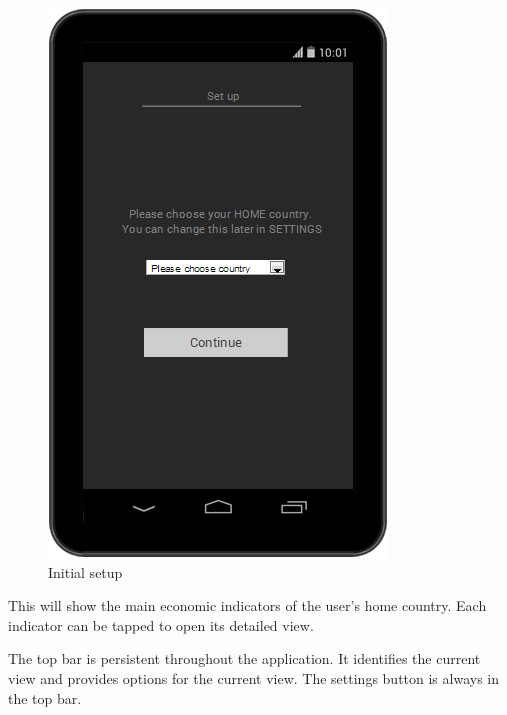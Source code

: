 \documentclass[12pt,a4paper,twoside]{article}
\begin{document}
\begin{figure}[H]
\centering
\includegraphics[scale=0.4]{mocks/setup.png}
\caption{Initial setup}
\end{figure}

This will show the main economic indicators of the user's home country. Each indicator can be tapped to open its detailed view.

The top bar is persistent throughout the application. It identifies the current view and provides options for the current view. The settings button is always in the top bar.
\end{document}
